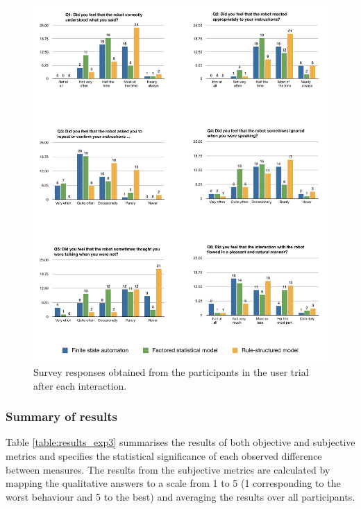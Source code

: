 \begin{figure}[p]
\begin{center}
\includegraphics[scale=0.5]{imgs/subjective.pdf}
\end{center} 
\caption{Survey responses obtained from the participants in the user trial after each interaction. }
\label{fig:subjective}
\end{figure}

\subsubsection*{Summary of results}

Table \ref{table:results_exp3} summarises the results of both objective and subjective metrics and specifies the statistical significance of each observed difference between measures.  The results from the subjective metrics are calculated by mapping the qualitative answers to a scale from 1 to 5 (1 corresponding to the worst behaviour and 5 to the best) and averaging the results over all participants. 


